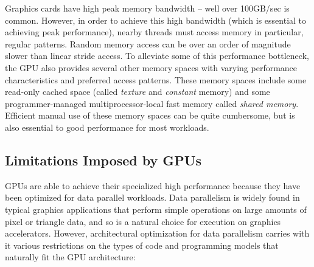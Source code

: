 \documentclass[preprint]{sigplanconf}
\begin{document}
Graphics cards have high peak memory bandwidth -- well over 100GB/sec is common.  However, in order to achieve this high bandwidth (which is essential to achieving peak performance), nearby threads must access memory in particular, regular patterns.  Random memory access can be over an order of magnitude slower than linear stride access.  To alleviate some of this performance bottleneck, the GPU also provides several other memory spaces with varying performance characteristics and preferred access patterns.  These memory spaces include some read-only cached space (called \emph{texture} and \emph{constant} memory) and some programmer-managed multiprocessor-local fast memory called \emph{shared memory}.  Efficient manual use of these memory spaces can be quite cumbersome, but is also essential to good performance for most workloads.

\subsection{Limitations Imposed by GPUs}
\label{GPULimitations}
GPUs are able to achieve their specialized high performance because they have been optimized for data parallel workloads. Data parallelism is widely found in typical graphics applications that perform simple operations on large amounts of pixel or triangle data, and so is a natural choice for execution on graphics accelerators.  However, architectural optimization for data parallelism carries with it various restrictions on the types of code and programming models that naturally fit the GPU architecture:
\end{document}
